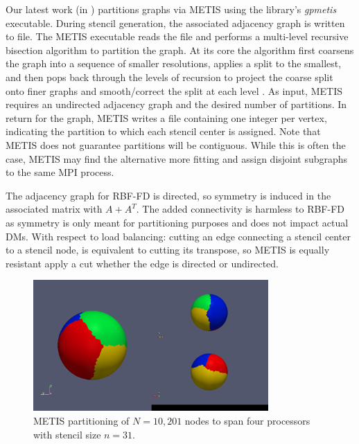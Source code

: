 \documentclass{report}
\begin{document}
Our latest work (in \cite{BolligRBFFDCode}) partitions graphs via METIS using the library's \emph{gpmetis} executable. During stencil generation, the associated adjacency graph is written to file. The METIS executable reads the file and performs a multi-level recursive bisection algorithm to partition the graph. At its core the algorithm first coarsens the graph into a sequence of smaller resolutions, applies a split to the smallest, and then pops back through the levels of recursion to project the coarse split onto finer graphs and smooth/correct the split at each level \cite{Karypis1999}. As input, METIS requires an undirected adjacency graph and the desired number of partitions. 
In return for the graph, METIS writes a file containing one integer per vertex, indicating the partition to which each stencil center is assigned. Note that METIS does not guarantee partitions will be contiguous. While this is often the case, METIS may find the alternative more fitting and assign disjoint subgraphs to the same MPI process. %

The adjacency graph for RBF-FD is directed, so symmetry is induced in the associated matrix with $A+A^T$. The added connectivity is harmless to RBF-FD as symmetry is only meant for partitioning purposes and does not impact actual DMs. With respect to load balancing: cutting an edge connecting a stencil center to a stencil node, is equivalent to cutting its transpose, so METIS is equally resistant apply a cut whether the edge is directed or undirected. 

\begin{figure}
\begin{center}
\includegraphics[width=0.8\textwidth]{rbffd_methods_content/decompositions/gpmetis_decomp_sphere_4parts.png}
\caption{METIS partitioning of $N=10,201$ nodes to span four processors with stencil size $n=31$. }
\label{fig:metis_decomposed_sphere}
\end{center}
\end{figure}
\end{document}
